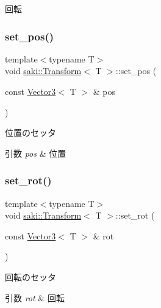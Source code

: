 回転 

\mbox{\label{classsaki_1_1_transform_a2659fe0773c0b8137b3a321859c3906e}} 
\subsubsection{\texorpdfstring{set\+\_\+pos()}{set\_pos()}}
{\footnotesize\ttfamily template$<$typename T$>$ \\
void \mbox{\hyperlink{classsaki_1_1_transform}{saki\+::\+Transform}}$<$ T $>$\+::set\+\_\+pos (\begin{DoxyParamCaption}\item[{const \mbox{\hyperlink{classsaki_1_1_vector3}{Vector3}}$<$ T $>$ \&}]{pos }\end{DoxyParamCaption})\hspace{0.3cm}{\ttfamily [inline]}}



位置のセッタ 


\begin{DoxyParams}{引数}
{\em pos} & 位置 \\
\hline
\end{DoxyParams}
\mbox{\label{classsaki_1_1_transform_a7b30f864722819b8be85ecbd4dde43a4}} 
\subsubsection{\texorpdfstring{set\+\_\+rot()}{set\_rot()}}
{\footnotesize\ttfamily template$<$typename T$>$ \\
void \mbox{\hyperlink{classsaki_1_1_transform}{saki\+::\+Transform}}$<$ T $>$\+::set\+\_\+rot (\begin{DoxyParamCaption}\item[{const \mbox{\hyperlink{classsaki_1_1_vector3}{Vector3}}$<$ T $>$ \&}]{rot }\end{DoxyParamCaption})\hspace{0.3cm}{\ttfamily [inline]}}



回転のセッタ 


\begin{DoxyParams}{引数}
{\em rot} & 回転 \\
\hline
\end{DoxyParams}
\mbox{\label{classsaki_1_1_transform_aade1855d64e42635e8b613aa055aa6fc}} 
